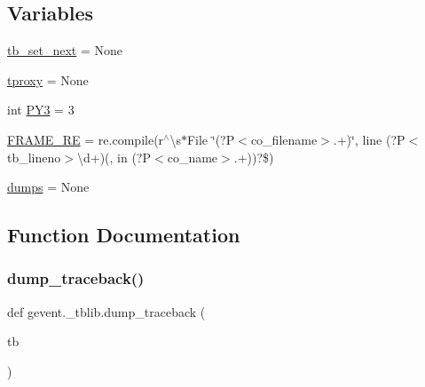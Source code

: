 \subsection*{Variables}
\begin{DoxyCompactItemize}
\item 
\hyperlink{namespacegevent_1_1__tblib_a37f0817eaeb0b92338005d7b58319fb9}{tb\+\_\+set\+\_\+next} = None
\item 
\hyperlink{namespacegevent_1_1__tblib_a42517bb98023230e43cef6c16679db31}{tproxy} = None
\item 
int \hyperlink{namespacegevent_1_1__tblib_a4b0ec454e1f620a605684d9cf18fa98c}{P\+Y3} = 3
\item 
\hyperlink{namespacegevent_1_1__tblib_abfd5d466338db90cfece0a39e148a4a0}{F\+R\+A\+M\+E\+\_\+\+RE} = re.\+compile(r\textquotesingle{}$^\wedge$\textbackslash{}s$\ast$File \char`\"{}(?P$<$co\+\_\+filename$>$.+)\char`\"{}, line (?P$<$tb\+\_\+lineno$>$\textbackslash{}d+)(, in (?P$<$co\+\_\+name$>$.+))?\$\textquotesingle{})
\item 
\hyperlink{namespacegevent_1_1__tblib_a611e4cdbc29b4e3335d94949747993d7}{dumps} = None
\end{DoxyCompactItemize}


\subsection{Function Documentation}
\mbox{\label{namespacegevent_1_1__tblib_af8b4fd4dac2bd31866c964fce7bb17f0}} 
\subsubsection{\texorpdfstring{dump\+\_\+traceback()}{dump\_traceback()}}
{\footnotesize\ttfamily def gevent.\+\_\+tblib.\+dump\+\_\+traceback (\begin{DoxyParamCaption}\item[{}]{tb }\end{DoxyParamCaption})}

\mbox{\label{namespacegevent_1_1__tblib_a10258bf4200e0c7dd0159d8f76628045}} 
